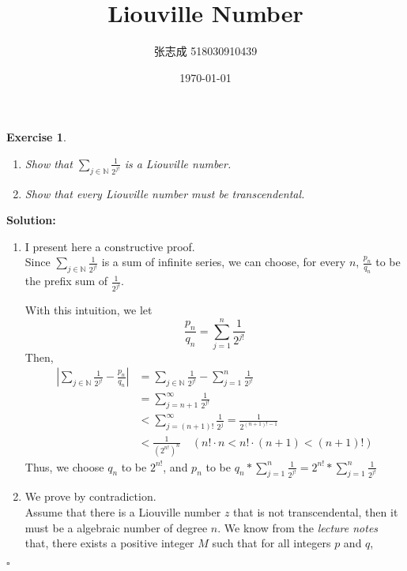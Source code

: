 \documentclass[UTF8, 12pt]{ctexart}
\title{Liouville Number}
\author{张志成 518030910439}
\date{\today}
\newenvironment{solution}{\noindent\ignorespaces\textbf{Solution:}}{\hfill $\square$\par\noindent}
\newtheorem*{exercise*}{Exercise}
\begin{document}
    \maketitle
    \begin{exercise*} 
        \begin{enumerate}[label=\arabic*)]
            \item Show that $\sum_{j\in\mathbb{N}}\frac{1}{2^{j!}}$ is a Liouville number.
            \item Show that every Liouville number must be transcendental.
        \end{enumerate}
    \end{exercise*}

    \begin{solution}
        \begin{enumerate}[label=\arabic*)]
            \item I present here a constructive proof. \\
                Since  $\sum_{j\in\mathbb{N}}\frac{1}{2^{j!}}$ is a sum of infinite series, we can choose, for every $n$, $\frac{p_n}{q_n}$ to be the prefix sum of $\frac{1}{2^{j!}}$. \par
                With this intuition, we let $$ \frac{p_n}{q_n} = \sum_{j = 1}^{n}\frac{1}{2^{j!}} $$
                Then, 
                \begin{align*}
                    |\sum_{j\in\mathbb{N}}\frac{1}{2^{j!}} - \frac{p_n}{q_n}| &= \sum_{j\in\mathbb{N}}\frac{1}{2^{j!}} - \sum_{j = 1}^{n}\frac{1}{2^{j!}} \\
                    &= \sum_{j = n + 1}^{\infty} \frac{1}{2^{j!}} \\
                    &< \sum_{j = (n + 1)!}^{\infty} \frac{1}{2^{j}} = \frac{1}{2^{(n+1)!-1}} \\
                    &< \frac{1}{(2^{n!})^n}\quad (n!\cdot n < n! \cdot (n+1) < (n+1)!)
                \end{align*}
                Thus, we choose $q_n$ to be $2^{n!}$, and $p_n$ to be $q_n * \sum_{j = 1}^{n}\frac{1}{2^{j!}} = 2^{n!} * \sum_{j = 1}^{n}\frac{1}{2^{j!}}$
            \item We prove by contradiction. \\
                Assume that there is a Liouville number $z$ that is not transcendental, then it must be a algebraic number of degree $n$.
                We know from the \textit{lecture notes} that, there exists a positive integer $M$ such that for all integers $p$ and $q$, 
                \begin{equation}

\end{equation}
\end{enumerate}
\end{solution}
\end{document}
